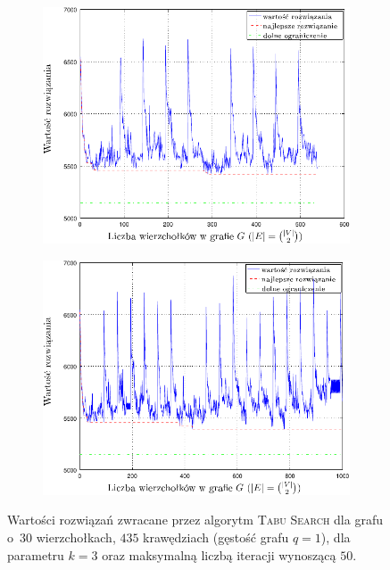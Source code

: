 \begin{figure}[!h]
	\renewcommand\figurename{Wykres}
	\null\hfill
	\begin{subfigure}[b]{0.45\textwidth}
		\includegraphics[width=\textwidth]{Chapter_VI/RRIMST8-example/RRIMST8_psfrag}
		\caption{}
		\label{fig:rrimst3:a}
	\end{subfigure}
	\hfill
	\begin{subfigure}[b]{0.45\textwidth}
		\includegraphics[width=\textwidth]{Chapter_VI/RRIMST9-example/RRIMST9_psfrag}
		\caption{}
		\label{fig:rrimst3:b}
	\end{subfigure}
	\hfill\null
	\caption{
		Wartości rozwiązań zwracane przez algorytm \textsc{Tabu Search} dla grafu o~$30$ wierzchołkach, $435$ krawędziach (gęstość grafu $q = 1$), dla parametru $k = 3$ oraz maksymalną liczbą iteracji wynoszącą $50$.
}
\end{figure}
